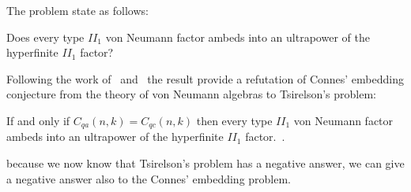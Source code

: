 The problem state as follows:

\begin{problem}
    Does every type $II_1$ von Neumann factor ambeds into an ultrapower of the hyperfinite $II_1$ factor?
\end{problem}

Following the work of~\cite{Tsirelson_1} and~\cite{Tsirelson_2} the result provide a refutation of Connes' embedding conjecture from the theory of von Neumann algebras to Tsirelson's problem:

\begin{theorem}
If and only if $C_{q a}(n, k) = C_{q c}(n, k)$ then every type $II_1$ von Neumann factor ambeds into an ultrapower of the hyperfinite $II_1$ factor.~\cite{mipre}.
\end{theorem}

because we now know that Tsirelson's problem has a negative answer, we can give a negative answer also to the Connes' embedding problem.

